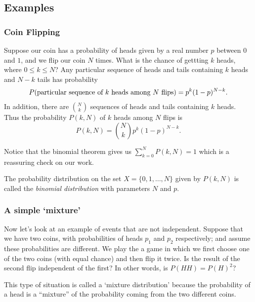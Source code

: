 \documentclass[
  oneside]{scrbook}
\renewcommand{\rm}{}
\begin{document}
\hypertarget{examples}{%
\subsection{Examples}\label{examples}}

\hypertarget{coin-flipping}{%
\subsubsection{Coin Flipping}\label{coin-flipping}}

Suppose our coin has a probability of heads given by a real number \(p\)
between \(0\) and \(1\), and we flip our coin \(N\) times. What is the
chance of gettting \(k\) heads, where \(0\le k\le N\)? Any particular
sequence of heads and tails containing \(k\) heads and \(N-k\) tails has
probability \[
P(\hbox{\rm particular sequence of $k$ heads among $N$ flips}) = p^{k}(1-p)^{N-k}.
\] In addition, there are \(\binom{N}{k}\) sequences of heads and tails
containing \(k\) heads. Thus the probability \(P(k,N)\) of \(k\) heads
among \(N\) flips is \begin{equation}
P(k,N) = \binom{N}{k}p^{k}(1-p)^{N-k}.
\label{eq:binomial}\end{equation}

Notice that the binomial theorem gives us \(\sum_{k=0}^{N} P(k,N) =1\)
which is a reassuring check on our work.

The probability distribution on the set \(X=\{0,1,\ldots,N\}\) given by
\(P(k,N)\) is called the \emph{binomial distribution} with parameters
\(N\) and \(p\).

\hypertarget{a-simple-mixture}{%
\subsubsection{A simple `mixture'}\label{a-simple-mixture}}

Now let's look at an example of events that are not independent. Suppose
that we have two coins, with probabilities of heads \(p_1\) and \(p_2\)
respectively; and assume these probabilities are different. We play the
a game in which we first choose one of the two coins (with equal chance)
and then flip it twice. Is the result of the second flip independent of
the first? In other words, is \(P(HH)=P(H)^2\)?

This type of situation is called a `mixture distribution' because the
probability of a head is a ``mixture'' of the probability coming from
the two different coins.
\end{document}
